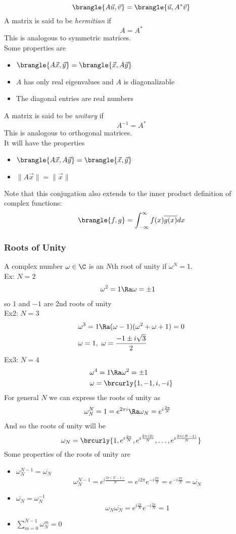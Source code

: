 $$\brangle{A\vec{u},\vec{v}}=\brangle{\vec{u},A^*\vec{v}}$$
A matrix is said to be \textit{hermitian} if
$$\boxed{A=A^*}$$
This is analogous to symmetric matrices.\\
Some properties are
\begin{itemize}
    \item $\brangle{A\vec{x},\vec{y}}=\brangle{\vec{x},A\vec{y}}$
    \item $A$ has only real eigenvalues and $A$ is diagonalizable
    \item The diagonal entries are real numbers
\end{itemize}
A matrix is said to be \textit{unitary} if
$$\boxed{A^{-1}=A^*}$$
This is analogous to orthogonal matrices.\\
It will have the properties
\begin{itemize}
    \item $\brangle{A\vec{x},A\vec{y}}=\brangle{\vec{x},\vec{y}}$
    \item $\|A\vec{x}\|=\|\vec{x}\|$
\end{itemize}
Note that this conjugation also extends to the inner product definition of complex functions:
$$\brangle{f,g}=\int_{-\infty}^\infty f(x)\overline{g(x)}dx$$

\subsubsection{Roots of Unity}
A complex number $\omega\in\C$ is an $N$th root of unity if $\omega^N=1$.\\
Ex: $N=2$
\begin{align*}
    &\omega^2=1\Ra \omega=\pm1
\end{align*}
so $1$ and $-1$ are 2nd roots of unity\\
Ex2: $N=3$
\begin{align*}
    &\omega^3=1\Ra (\omega-1)(\omega^2+\omega+1)=0\\
    &\omega=1,\ \omega=\frac{-1\pm i\sqrt{3}}{2}
\end{align*}
Ex3: $N=4$
\begin{align*}
    &\omega^4=1\Ra \omega^2=\pm1\\
    &\omega=\brcurly{1,-1,i,-i}
\end{align*}
For general $N$ we can express the roots of unity as
\begin{align*}
    &\omega_N^N=1=e^{2\pi i}\Ra \omega_N=e^{i\frac{2\pi}{N}}
\end{align*}
And so the roots of unity will be
$$\omega_N=\brcurly{1,e^{i\frac{2\pi}{N}},e^{i\frac{2\pi(2)}{N}},\ldots,e^{i\frac{2\pi(N-1)}{N}}}$$
Some properties of the roots of unity are
\begin{itemize}
    \item $\omega_N^{N-1}=\overline{\omega_N}$
    \[ \omega_N^{N-1}=e^{i\frac{2\pi(N-1)}{N}}=e^{i2\pi}e^{-i\frac{2\pi}{N}}=e^{-i\frac{2\pi}{N}}=\overline{\omega_N} \]
    \item $\overline{\omega_N}=\omega_N^{-1}$
    \[ \omega_N\overline{\omega_N}=e^{i\frac{2\pi}{N}}e^{-i\frac{2\pi}{N}}=1 \]
    \item $\sum\limits_{m=0}^{N-1}\omega_N^m=0$
\end{itemize}

